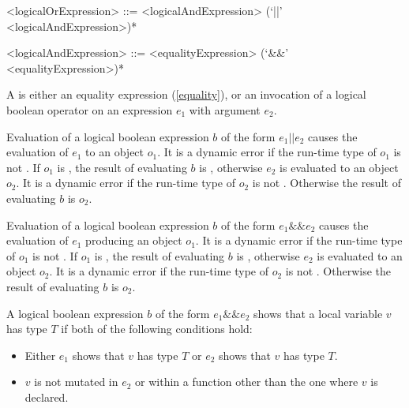 \documentclass[makeidx]{article}
\begin{document}
{\begin{grammar}
<logicalOrExpression> ::= \gnewline{}
  <logicalAndExpression> (`||' <logicalAndExpression>)*

<logicalAndExpression> ::= <equalityExpression> (`\&\&' <equalityExpression>)*
\end{grammar}

\LMHash{}%
A  is either an equality expression (\ref{equality}), or an invocation of a logical boolean operator on an expression $e_1$ with argument $e_2$.

\LMHash{}%
Evaluation of a logical boolean expression $b$ of the form $e_1 || e_2$ causes
the evaluation of $e_1$ to an object $o_1$.
It is a dynamic error if the run-time type of $o_1$ is not .
If $o_1$ is \TRUE, the result of evaluating $b$ is \TRUE, otherwise $e_2$ is evaluated to an object $o_2$.
It is a dynamic error if the run-time type of $o_2$ is not .
Otherwise the result of evaluating $b$ is $o_2$.

\LMHash{}%
Evaluation of a logical boolean expression $b$ of the form $e_1 \&\& e_2$ causes the evaluation of $e_1$ producing an object $o_1$.
It is a dynamic error if the run-time type of $o_1$ is not .
If $o_1$ is \FALSE, the result of evaluating $b$ is \FALSE, otherwise $e_2$ is evaluated to an object $o_2$.
It is a dynamic error if the run-time type of $o_2$ is not .
Otherwise the result of evaluating $b$ is $o_2$.

\LMHash{}%
A logical boolean expression $b$ of the form $e_1 \&\& e_2$
shows that a local variable $v$ has type $T$
if both of the following conditions hold:
\begin{itemize}
\item Either $e_1$ shows that $v$ has type $T$ or $e_2$ shows that $v$ has type $T$.
\item $v$ is not mutated in $e_2$ or within a function other than the one where $v$ is declared.
\end{itemize}

}
\end{document}
